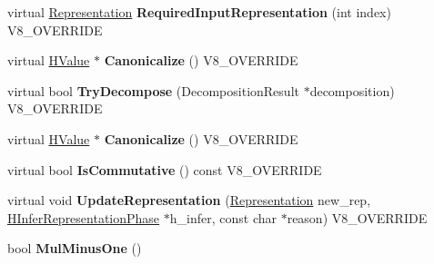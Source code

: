 \begin{DoxyCompactItemize}
\item 
\hypertarget{classv8_1_1internal_1_1_v8___f_i_n_a_l_a6c6d1f37f40b113d8f4062f1ffff7215}{}virtual \hyperlink{classv8_1_1internal_1_1_representation}{Representation} {\bfseries Required\+Input\+Representation} (int index) V8\+\_\+\+O\+V\+E\+R\+R\+I\+D\+E\label{classv8_1_1internal_1_1_v8___f_i_n_a_l_a6c6d1f37f40b113d8f4062f1ffff7215}

\item 
\hypertarget{classv8_1_1internal_1_1_v8___f_i_n_a_l_aad5f871e0a6782c02e742ec017eca3cd}{}virtual \hyperlink{classv8_1_1internal_1_1_h_value}{H\+Value} $\ast$ {\bfseries Canonicalize} () V8\+\_\+\+O\+V\+E\+R\+R\+I\+D\+E\label{classv8_1_1internal_1_1_v8___f_i_n_a_l_aad5f871e0a6782c02e742ec017eca3cd}

\item 
\hypertarget{classv8_1_1internal_1_1_v8___f_i_n_a_l_a01868e84795163ab610a20c7f7c4f7ea}{}virtual bool {\bfseries Try\+Decompose} (Decomposition\+Result $\ast$decomposition) V8\+\_\+\+O\+V\+E\+R\+R\+I\+D\+E\label{classv8_1_1internal_1_1_v8___f_i_n_a_l_a01868e84795163ab610a20c7f7c4f7ea}

\item 
\hypertarget{classv8_1_1internal_1_1_v8___f_i_n_a_l_aad5f871e0a6782c02e742ec017eca3cd}{}virtual \hyperlink{classv8_1_1internal_1_1_h_value}{H\+Value} $\ast$ {\bfseries Canonicalize} () V8\+\_\+\+O\+V\+E\+R\+R\+I\+D\+E\label{classv8_1_1internal_1_1_v8___f_i_n_a_l_aad5f871e0a6782c02e742ec017eca3cd}

\item 
\hypertarget{classv8_1_1internal_1_1_v8___f_i_n_a_l_afbf350c98bc012a32e462f18ba21a137}{}virtual bool {\bfseries Is\+Commutative} () const V8\+\_\+\+O\+V\+E\+R\+R\+I\+D\+E\label{classv8_1_1internal_1_1_v8___f_i_n_a_l_afbf350c98bc012a32e462f18ba21a137}

\item 
\hypertarget{classv8_1_1internal_1_1_v8___f_i_n_a_l_a646a7a4ee98ffeb1773e958bd227f429}{}virtual void {\bfseries Update\+Representation} (\hyperlink{classv8_1_1internal_1_1_representation}{Representation} new\+\_\+rep, \hyperlink{classv8_1_1internal_1_1_h_infer_representation_phase}{H\+Infer\+Representation\+Phase} $\ast$h\+\_\+infer, const char $\ast$reason) V8\+\_\+\+O\+V\+E\+R\+R\+I\+D\+E\label{classv8_1_1internal_1_1_v8___f_i_n_a_l_a646a7a4ee98ffeb1773e958bd227f429}

\item 
\hypertarget{classv8_1_1internal_1_1_v8___f_i_n_a_l_aebdde22ed5fff424ec592b741e533f79}{}bool {\bfseries Mul\+Minus\+One} ()\label{classv8_1_1internal_1_1_v8___f_i_n_a_l_aebdde22ed5fff424ec592b741e533f79}


\end{DoxyCompactItemize}
